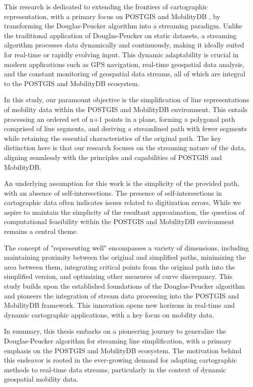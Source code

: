 \documentclass[twoside,12pt, a4paper]{report}
\begin{document}
This research is dedicated to extending the frontiers of cartographic representation, with a primary focus on POSTGIS and MobilityDB \cite{zimanyi2019mobilitydb}, by transforming the Douglas-Peucker algorithm into a streaming paradigm. Unlike the traditional application of Douglas-Peucker on static datasets, a streaming algorithm processes data dynamically and continuously, making it ideally suited for real-time or rapidly evolving input. This dynamic adaptability is crucial in modern applications such as GPS navigation, real-time geospatial data analysis, and the constant monitoring of geospatial data streams, all of which are integral to the POSTGIS and MobilityDB ecosystem.

In this study, our paramount objective is the simplification of line representations of mobility data within the POSTGIS and MobilityDB environment. This entails processing an ordered set of n+1 points in a plane, forming a polygonal path comprised of line segments, and deriving a streamlined path with fewer segments while retaining the essential characteristics of the original path. The key distinction here is that our research focuses on the streaming nature of the data, aligning seamlessly with the principles and capabilities of POSTGIS and MobilityDB.

An underlying assumption for this work is the simplicity of the provided path, with an absence of self-intersections. The presence of self-intersections in cartographic data often indicates issues related to digitization errors. While we aspire to maintain the simplicity of the resultant approximation, the question of computational feasibility within the POSTGIS and MobilityDB environment remains a central theme.

The concept of "representing well" encompasses a variety of dimensions, including maintaining proximity between the original and simplified paths, minimizing the area between them, integrating critical points from the original path into the simplified version, and optimizing other measures of curve discrepancy. This study builds upon the established foundations of the Douglas-Peucker algorithm and pioneers the integration of stream data processing into the POSTGIS and MobilityDB framework. This innovation opens new horizons in real-time and dynamic cartographic applications, with a key focus on mobility data.

In summary, this thesis embarks on a pioneering journey to generalize the Douglas-Peucker algorithm for streaming line simplification, with a primary emphasis on the POSTGIS and MobilityDB ecosystem. The motivation behind this endeavor is rooted in the ever-growing demand for adapting cartographic methods to real-time data streams, particularly in the context of dynamic geospatial mobility data.
\end{document}
